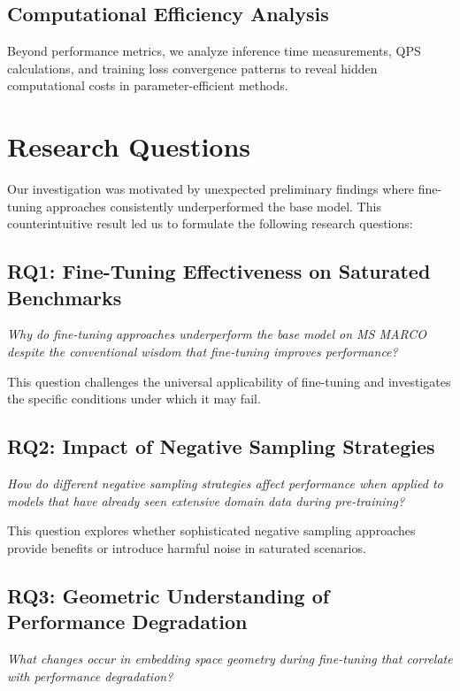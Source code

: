 \subsection{Computational Efficiency Analysis}

Beyond performance metrics, we analyze inference time measurements, QPS calculations, and training loss convergence patterns to reveal hidden computational costs in parameter-efficient methods.

\section{Research Questions}

Our investigation was motivated by unexpected preliminary findings where fine-tuning approaches consistently underperformed the base model. This counterintuitive result led us to formulate the following research questions:

\subsection{RQ1: Fine-Tuning Effectiveness on Saturated Benchmarks}

\textit{Why do fine-tuning approaches underperform the base model on MS MARCO despite the conventional wisdom that fine-tuning improves performance?}

This question challenges the universal applicability of fine-tuning and investigates the specific conditions under which it may fail.

\subsection{RQ2: Impact of Negative Sampling Strategies}

\textit{How do different negative sampling strategies affect performance when applied to models that have already seen extensive domain data during pre-training?}

This question explores whether sophisticated negative sampling approaches provide benefits or introduce harmful noise in saturated scenarios.

\subsection{RQ3: Geometric Understanding of Performance Degradation}

\textit{What changes occur in embedding space geometry during fine-tuning that correlate with performance degradation?}

